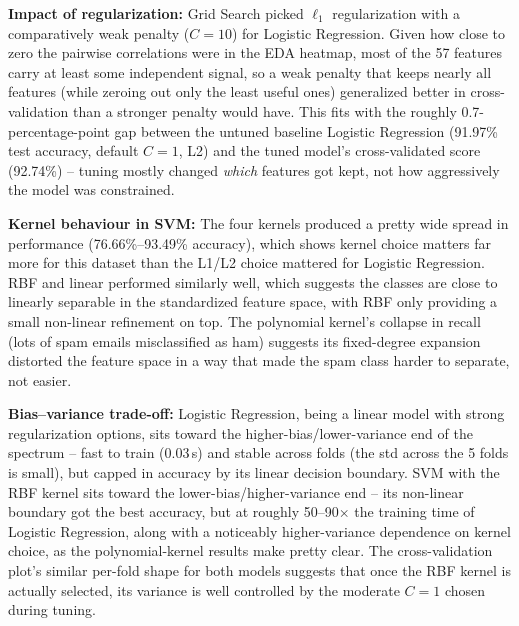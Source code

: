 \documentclass[12pt,a4paper]{article}
\begin{document}
\textbf{Impact of regularization:} Grid Search picked $\ell_1$ regularization with a
comparatively weak penalty ($C=10$) for Logistic Regression. Given how close to zero
the pairwise correlations were in the EDA heatmap, most of the 57 features carry at
least some independent signal, so a weak penalty that keeps nearly all features
(while zeroing out only the least useful ones) generalized better in cross-validation
than a stronger penalty would have. This fits with the roughly 0.7-percentage-point
gap between the untuned baseline Logistic Regression (91.97\% test accuracy, default
$C=1$, L2) and the tuned model's cross-validated score (92.74\%) -- tuning mostly
changed \emph{which} features got kept, not how aggressively the model was
constrained.
 
\textbf{Kernel behaviour in SVM:} The four kernels produced a pretty wide spread in
performance (76.66\%--93.49\% accuracy), which shows kernel choice matters far more
for this dataset than the L1/L2 choice mattered for Logistic Regression. RBF and
linear performed similarly well, which suggests the classes are close to linearly
separable in the standardized feature space, with RBF only providing a small
non-linear refinement on top. The polynomial kernel's collapse in recall (lots of
spam emails misclassified as ham) suggests its fixed-degree expansion distorted the
feature space in a way that made the spam class harder to separate, not easier.
 
\textbf{Bias--variance trade-off:} Logistic Regression, being a linear model with
strong regularization options, sits toward the higher-bias/lower-variance end of the
spectrum -- fast to train (0.03\,s) and stable across folds (the std across the 5
folds is small), but capped in accuracy by its linear decision boundary. SVM with the
RBF kernel sits toward the lower-bias/higher-variance end -- its non-linear boundary
got the best accuracy, but at roughly 50--90$\times$ the training time of Logistic
Regression, along with a noticeably higher-variance dependence on kernel choice, as
the polynomial-kernel results make pretty clear. The cross-validation plot's similar
per-fold shape for both models suggests that once the RBF kernel is actually
selected, its variance is well controlled by the moderate $C=1$ chosen during tuning.
 
\end{document}
